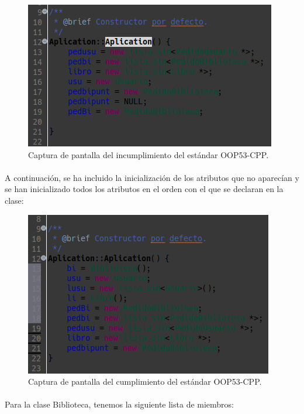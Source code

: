 			\begin{figure}[H]
				\centering
				\includegraphics[scale=0.7]{img/captura3.png}
				\caption{Captura de pantalla del incumplimiento del estándar OOP53-CPP.}
				\label{captura3}
			\end{figure}
		
			\paragraph{} A continuación, se ha incluido la inicialización de los atributos que no aparecían y se han inicializado todos los atributos en el orden con el que se declaran en la clase:
			
			\begin{figure}[H]
				\centering
				\includegraphics[scale=0.7]{img/captura4.png}
				\caption{Captura de pantalla del cumplimiento del estándar OOP53-CPP.}
				\label{captura4}
			\end{figure}
		
				\paragraph{}Para la clase Biblioteca, tenemos la siguiente lista de miembros:
			
